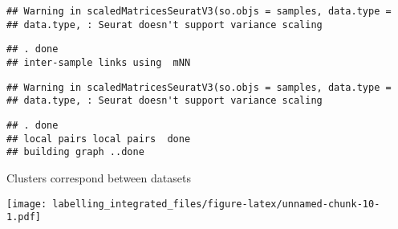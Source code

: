\documentclass[]{article}
\newenvironment{Shaded}{\begin{snugshade}}{\end{snugshade}}
\newcommand{\CommentTok}[1]{\textcolor[rgb]{0.56,0.35,0.01}{\textit{#1}}}
\newcommand{\DataTypeTok}[1]{\textcolor[rgb]{0.13,0.29,0.53}{#1}}
\newcommand{\DecValTok}[1]{\textcolor[rgb]{0.00,0.00,0.81}{#1}}
\newcommand{\KeywordTok}[1]{\textcolor[rgb]{0.13,0.29,0.53}{\textbf{#1}}}
\newcommand{\NormalTok}[1]{#1}
\newcommand{\OperatorTok}[1]{\textcolor[rgb]{0.81,0.36,0.00}{\textbf{#1}}}
\newcommand{\StringTok}[1]{\textcolor[rgb]{0.31,0.60,0.02}{#1}}
\begin{document}
\begin{verbatim}
## Warning in scaledMatricesSeuratV3(so.objs = samples, data.type =
## data.type, : Seurat doesn't support variance scaling
\end{verbatim}

\begin{verbatim}
## . done
## inter-sample links using  mNN
\end{verbatim}

\begin{verbatim}
## Warning in scaledMatricesSeuratV3(so.objs = samples, data.type =
## data.type, : Seurat doesn't support variance scaling
\end{verbatim}

\begin{verbatim}
## . done
## local pairs local pairs  done
## building graph ..done
\end{verbatim}

\begin{Shaded}
\end{Shaded}

Clusters correspond between datasets

\begin{Shaded}
\end{Shaded}

\texttt{[image: labelling\_integrated\_files/figure-latex/unnamed-chunk-10-1.pdf]}

\begin{Shaded}
\end{Shaded}
\end{document}
